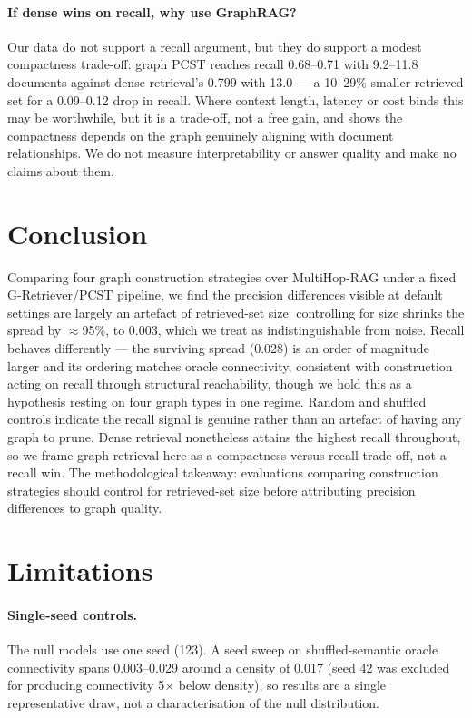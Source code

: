 \documentclass[11pt]{article}
\begin{document}
\paragraph{If dense wins on recall, why use GraphRAG?} Our data do not support a recall argument, but they do support a modest compactness trade-off: graph PCST reaches recall 0.68--0.71 with 9.2--11.8 documents against dense retrieval's 0.799 with 13.0 --- a 10--29\% smaller retrieved set for a 0.09--0.12 drop in recall. Where context length, latency or cost binds this may be worthwhile, but it is a trade-off, not a free gain, and  shows the compactness depends on the graph genuinely aligning with document relationships. We do not measure interpretability or answer quality and make no claims about them.

\section{Conclusion}

Comparing four graph construction strategies over MultiHop-RAG under a fixed G-Retriever/PCST pipeline, we find the precision differences visible at default settings are largely an artefact of retrieved-set size: controlling for size shrinks the spread by $\approx$95\%, to 0.003, which we treat as indistinguishable from noise. Recall behaves differently --- the surviving spread (0.028) is an order of magnitude larger and its ordering matches oracle connectivity, consistent with construction acting on recall through structural reachability, though we hold this as a hypothesis resting on four graph types in one regime. Random and shuffled controls indicate the recall signal is genuine rather than an artefact of having any graph to prune. Dense retrieval nonetheless attains the highest recall throughout, so we frame graph retrieval here as a compactness-versus-recall trade-off, not a recall win. The methodological takeaway: evaluations comparing construction strategies should control for retrieved-set size before attributing precision differences to graph quality.

\section*{Limitations}

\paragraph{Single-seed controls.} The null models use one seed (123). A seed sweep on shuffled-semantic oracle connectivity spans 0.003--0.029 around a density of 0.017 (seed 42 was excluded for producing connectivity 5$\times$ below density), so results are a single representative draw, not a characterisation of the null distribution.
\end{document}
